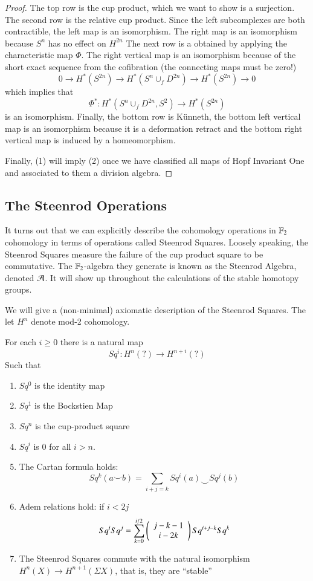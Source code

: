 \begin{proof}
  The top row is the cup product, which we want to show is a surjection.
  The second row is the relative cup product.  
  Since the left subcomplexes are both contractible, the left map is an isomorphism.
  The right map is an isomorphism because $S^n$ has no effect on $H^{2n}$
  The next row is a obtained by applying the characteristic map $\Phi$.  
  The right vertical map is an isomorphism because of the short exact sequence from the cofibration (the connecting maps must be zero!) 
  \[0\to H^*(S^{2n})\to H^*(S^{n}\cup_f D^{2n})\to H^*(S^{2n})\to 0 \]
  which implies that
  \[\Phi^*:H^*(S^{n}\cup_f D^{2n},S^{2})\to H^*(S^{2n})\]
  is an isomorphism.
  Finally, the bottom row is K\"{u}nneth, the bottom left vertical map is an isomorphism because it is a deformation retract and the bottom right vertical map is induced by a homeomorphism.  


  Finally, (1) will imply (2) once we have classified all maps of Hopf Invariant One and associated to them a division algebra.  
  

\end{proof}


\subsection{The Steenrod Operations}

\label{sec:SteenrodCohom}

It turns out that we can explicitly describe the cohomology operations in $\mathbb{F}_2$ cohomology in terms of operations called Steenrod Squares.  
Loosely speaking, the Steenrod Squares measure the failure of the cup product square to be commutative.  
The $\mathbb{F}_2$-algebra they generate is known as the Steenrod Algebra, denoted $\mathcal{A}$.  It will show up throughout the calculations of the stable homotopy groups.  

We will give a (non-minimal) axiomatic description of the Steenrod Squares.
The let $H^n$ denote mod-2 cohomology.  

\begin{Theorem}
  For each $i\ge 0$ there is a natural map
  \[Sq^i:H^n(?)\to H^{n+i}(?)\]
  Such that
  \begin{enumerate}
    \item $Sq^0$ is the identity map
    \item $Sq^1$ is the Bockstien Map
    \item $Sq^n$ is the cup-product square
    \item $Sq^i$ is 0 for all $i>n$.  
    \item The Cartan formula holds:
      \[Sq^k(a\smile b)=\sum_{i+j=k}Sq^i(a)\smile Sq^j(b)\]
    \item Adem relations hold: if $i<2j$
      \[Sq^iSq^j=\sum_{k=0}^{i/2}\left(\begin{array}{c}j-k-1\\i-2k\end{array}\right)Sq^{i+j-k}Sq^k\]
    \item The Steenrod Squares commute with the natural isomorphism $H^n(X)\to H^{n+1}(\Sigma X)$, that is, they are ``stable''
  \end{enumerate}
\end{Theorem}


